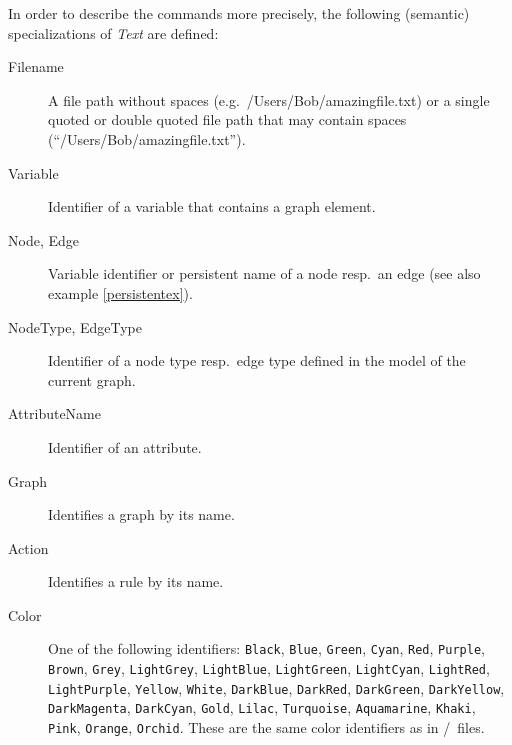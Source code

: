 In order to describe the commands more precisely, the following (semantic) specializations of \emph{Text} are defined:
\begin{description}
  \item[Filename]A file path without spaces (e.g.\ /Users/Bob/amazing\textunderscore file.txt) or a single quoted or double quoted file path that may contain spaces (``/Users/Bob/amazing\textunderscore file.txt'').
  \item[Variable] Identifier of a variable that contains a graph element. 
  \item[Node, Edge] Variable identifier or persistent name of a node resp.\ an edge (see also example \ref{persistentex}).
  \item[NodeType, EdgeType] Identifier of a node type resp.\ edge type defined in the model of the current graph.
  \item[AttributeName] Identifier of an attribute.
  \item[Graph] Identifies a graph by its name.
  \item[Action] Identifies a rule by its name.
  \item[Color] One of the following  identifiers: \texttt{Black}, \texttt{Blue}, \texttt{Green}, \texttt{Cyan}, \texttt{Red}, \texttt{Purple}, \texttt{Brown}, \texttt{Grey}, \texttt{LightGrey}, \texttt{LightBlue}, \texttt{LightGreen}, \texttt{LightCyan}, \texttt{LightRed}, \texttt{LightPurple}, \texttt{Yellow}, \texttt{White}, \texttt{DarkBlue}, \texttt{DarkRed}, \texttt{DarkGreen}, \texttt{DarkYellow}, \texttt{DarkMagenta}, \texttt{DarkCyan}, \texttt{Gold}, \texttt{Lilac}, \texttt{Turquoise}, \texttt{Aquamarine}, \texttt{Khaki}, \texttt{Pink}, \texttt{Orange}, \texttt{Orchid}. These are the same color identifiers as in /\yComp\ files.
\end{description}

